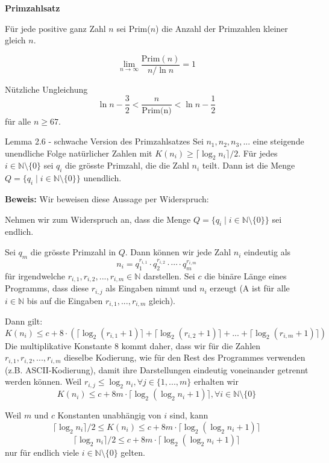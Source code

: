 \documentclass[a4paper, 11pt]{article}
\def\N{\mathbb{N}}
\begin{document}
    
    
        \textbf{Primzahlsatz}

        Für jede positive ganz Zahl $n$ sei Prim($n$) die Anzahl der Primzahlen kleiner gleich $n$. 
        \begin{mainbox}{}
            $$\lim_{n \to \infty}\frac{\text{Prim}(n)}{n/\ln n} = 1$$
        \end{mainbox}
        Nützliche Ungleichung
        $$\ln n - \frac{3}{2} < \frac{n}{\text{Prim(n)}} < \ln n - \frac{1}{2}$$
        für alle $n \geq 67$.
    
        \begin{mainbox}{Lemma 2.6 - schwache Version des Primzahlsatzes}
            Sei $n_1, n_2, n_3, ...$ eine steigende unendliche Folge natürlicher Zahlen mit $K(n_i) \geq \lceil \log_2 n_i \rceil / 2$. Für jedes $i \in \N \setminus \{0\}$ sei $q_i$ die grösste Primzahl, die die Zahl $n_i$ teilt. Dann ist die Menge $Q = \{q_i \mid i \in \N \setminus\{0\}\}$ unendlich.
        \end{mainbox}
        \textbf{Beweis: }
        Wir beweisen diese Aussage per Widerspruch:
    
        Nehmen wir zum Widerspruch an, dass die Menge $Q = \{q_i \mid i \in \N \setminus \{0\}\}$ sei endlich. 
        
        Sei $q_m$ die grösste Primzahl in $Q$. Dann können wir jede Zahl $n_i$ eindeutig als 
        $$n_i = q_1^{r_{i, 1}} \cdot q_2^{r_{i,2}} \cdot \cdots \cdot q_m^{r_{i,m}}$$
        für irgendwelche $r_{i,1}, r_{i,2}, ..., r_{i,m} \in \N$ darstellen. Sei $c$ die binäre Länge eines Programms, dass diese $r_{i,j}$ als Eingaben nimmt und $n_i$ erzeugt (A ist für alle $i\in \N$ bis auf die Eingaben $r_{i,1}, ..., r_{i,m}$ gleich).
        
        Dann gilt:
        $$K(n_i) \leq c + 8 \cdot (\lceil \log_2(r_{i,1}+1)\rceil + \lceil \log_2(r_{i,2}+1)\rceil + ... + \lceil \log_2(r_{i,m}+1)\rceil)$$
        Die multiplikative Konstante $8$ kommt daher, dass wir für die Zahlen $r_{i,1}, r_{i,2}, ..., r_{i,m}$ dieselbe Kodierung, wie für den Rest des Programmes verwenden (z.B. ASCII-Kodierung), damit ihre Darstellungen eindeutig voneinander getrennt werden können. Weil  $r_{i,j} \leq \log_2 n_i, \forall j \in \{1, ..., m\}$ erhalten wir 
        $$K(n_i) \leq c + 8m \cdot \lceil \log_2(\log_2 n_i + 1)\rceil, \forall i \in \N \setminus \{0\}$$
       
        Weil $m$ und $c$ Konstanten unabhängig von $i$ sind, kann 
        $$\lceil \log_2 n_i \rceil / 2 \leq K(n_i) \leq c + 8m \cdot \lceil \log_2(\log_2 n_i + 1)\rceil$$
        $$\lceil \log_2 n_i \rceil/2 \leq c + 8m \cdot \lceil \log_2(\log_2 n_i + 1)\rceil$$
        nur für endlich viele $i \in \N \setminus \{0\}$ gelten. 
    
\end{document}
